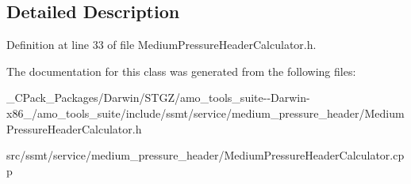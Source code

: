 \subsection{Detailed Description}


Definition at line 33 of file Medium\+Pressure\+Header\+Calculator.\+h.



The documentation for this class was generated from the following files\+:\begin{DoxyCompactItemize}
\item 
\+\_\+\+C\+Pack\+\_\+\+Packages/\+Darwin/\+S\+T\+G\+Z/amo\+\_\+tools\+\_\+suite-\/-\/\+Darwin-\/x86\+\_/amo\+\_\+tools\+\_\+suite/include/ssmt/service/medium\+\_\+pressure\+\_\+header/Medium\+Pressure\+Header\+Calculator.\+h\item 
src/ssmt/service/medium\+\_\+pressure\+\_\+header/Medium\+Pressure\+Header\+Calculator.\+cpp\end{DoxyCompactItemize}
